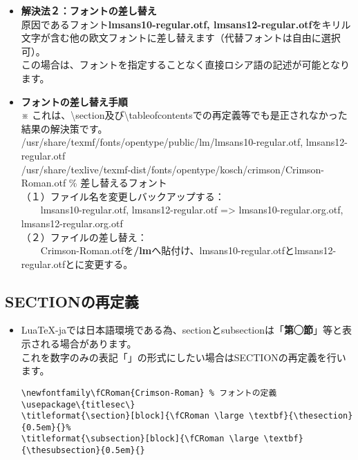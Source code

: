 \documentclass[a4paper,10pt]{ltjsarticle}
\def\colH#1{\color[HTML]{#1}}
\def\fs#1{\fontsize{#1}{#1}\selectfont }
\def\bs{\textbackslash }
\begin{document}
\begin{itemize}
  \item[]\textbf{解決法２：フォントの差し替え}\\
原因であるフォント\textbf{lmsans10-regular.otf, lmsans12-regular.otf}をキリル文字が含む他の欧文フォントに差し替えます（代替フォントは自由に選択可）。\\
この場合は、フォントを指定することなく直接ロシア語の記述が可能となります。
  \item[]\textbf{フォントの差し替え手順}\\
  ※ これは、\bs section及び\bs tableofcontentsでの再定義等でも是正されなかった結果の解決策です。\\
/usr/share/texmf/fonts/opentype/public/lm/{\colH{800000}lmsans10-regular.otf}, {\colH{800000}lmsans12-regular.otf}\\
/usr/share/texlive/texmf-dist/fonts/opentype/kosch/crimson/{\colH{800000}Crimson-Roman.otf} \% 差し替えるフォント\\
（１）ファイル名を変更しバックアップする：\\
　　lmsans10-regular.otf, lmsans12-regular.otf => lmsans10-regular{\colH{800000}.org}.otf, lmsans12-regular{\colH{800000}.org}.otf\\
（２）ファイルの差し替え：\\
　　{\colH{800000}Crimson-Roman.otf}を\textbf{/lm}へ貼付け、lmsans10-regular.otfとlmsans12-regular.otfとに変更する。
\end{itemize}

\subsection{SECTIONの再定義}
\begin{itemize}
  \item Lua\TeX{}-jaでは日本語環境である為、{\colH{800000}section}と{\colH{800000}subsection}は「\textbf{第◯節}」等と表示される場合があります。\\
  これを数字のみの表記「\textbf{}」の形式にしたい場合はSECTIONの再定義を行います。
\begin{verbatim}
\newfontfamily\fCRoman{Crimson-Roman} % フォントの定義
\usepackage\{titlesec\}
\titleformat{\section}[block]{\fCRoman \large \textbf}{\thesection}{0.5em}{}% 
\titleformat{\subsection}[block]{\fCRoman \large \textbf}{\thesubsection}{0.5em}{}
\end{verbatim}
\end{itemize}
\end{document}
